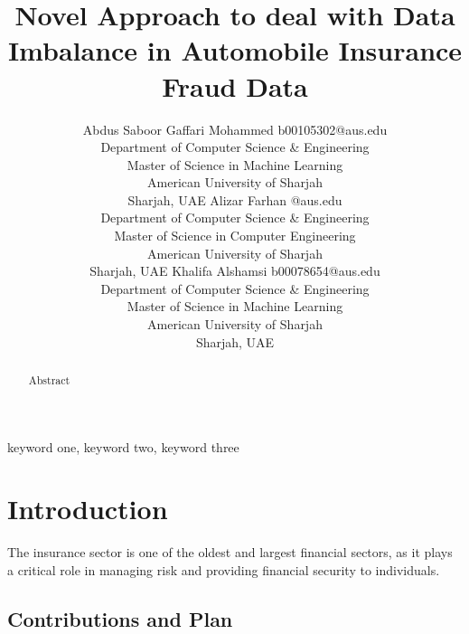 \documentclass[twoside,11pt]{article}
\begin{document}
\title{Novel Approach to deal with Data Imbalance in Automobile Insurance Fraud Data}

\author{\name Abdus Saboor Gaffari Mohammed \email b00105302@aus.edu \\
        \addr Department of Computer Science \& Engineering\\
        Master of Science in Machine Learning\\
        American University of Sharjah\\
        Sharjah, UAE
        \AND
        \name Alizar Farhan \email @aus.edu \\
        \addr Department of Computer Science \& Engineering\\
        Master of Science in Computer Engineering\\
        American University of Sharjah\\
        Sharjah, UAE
        \AND
        \name Khalifa Alshamsi \email b00078654@aus.edu \\
        \addr Department of Computer Science \& Engineering\\
        Master of Science in Machine Learning\\
        American University of Sharjah\\
        Sharjah, UAE
       } 

\maketitle

\begin{abstract}%
Abstract
\end{abstract}

\begin{keywords}
  keyword one, keyword two, keyword three
\end{keywords}

\section{Introduction}
The insurance sector is one of the oldest and largest financial sectors, as it plays a critical role in managing risk and providing financial security to individuals. 


\subsection{Contributions and Plan}
% 
\end{document}
